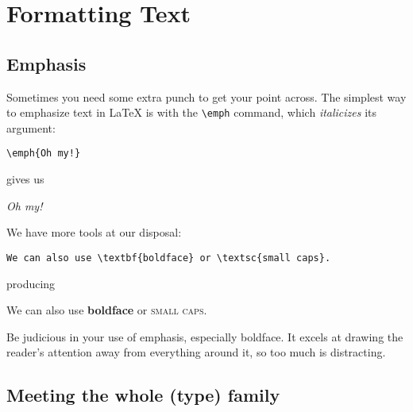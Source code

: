 \chapter{Formatting Text}
\label{formatting}

\section{Emphasis}

Sometimes you need some extra punch to get your point across.
The simplest way to emphasize text in \LaTeX{} is with the \verb|\emph| command,
which \emph{italicizes} its argument:
\begin{leftfigure}
\begin{lstlisting}
\emph{Oh my!}
\end{lstlisting}
\end{leftfigure}
gives us
\begin{leftfigure}
\lm \emph{Oh my!}
\end{leftfigure}
We have more tools at our disposal:
\begin{leftfigure}
\begin{lstlisting}
We can also use \textbf{boldface} or \textsc{small caps}.
\end{lstlisting}
\end{leftfigure}
producing
\begin{leftfigure}
\lm%
We can also use \textbf{boldface} or \textsc{small caps}.
\end{leftfigure}
Be judicious in your use of emphasis, especially boldface.
It excels at drawing the reader's attention away from everything around it,
so too much is distracting.

\section{Meeting the whole (type) family}

